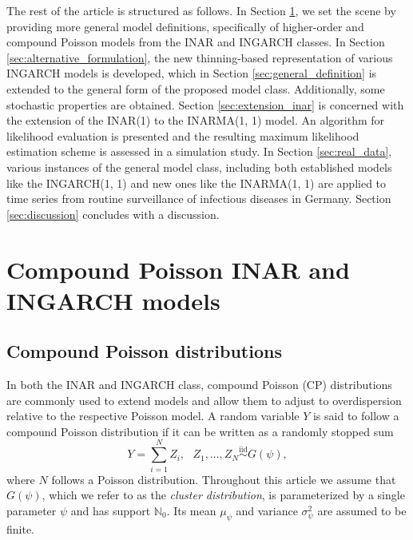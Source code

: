 \documentclass{article}
\begin{document}
The rest of the article is structured as follows. In Section \ref{sec:defintions}, we set the scene by providing more general model definitions, specifically of higher-order and compound Poisson \cite{Schweer2014, Goncalves2015} models from the INAR and INGARCH classes. In Section \ref{sec:alternative_formulation}, the new thinning-based representation of various INGARCH models is developed, which in Section \ref{sec:general_definition} is extended to the general form of the proposed model class. Additionally, some stochastic properties are obtained. Section \ref{sec:extension_inar} is concerned with the extension of the INAR(1) to the INARMA(1, 1) model. An algorithm for likelihood evaluation is presented and the resulting maximum likelihood estimation scheme is assessed in a simulation study. In Section \ref{sec:real_data}, various instances of the general model class, including both established models like the INGARCH(1, 1) and new ones like the INARMA(1, 1) are applied to time series from routine surveillance of infectious diseases in Germany. Section \ref{sec:discussion} concludes with a discussion.


\section{Compound Poisson INAR and INGARCH models}
\label{sec:defintions}

\subsection{Compound Poisson distributions}

In both the INAR and INGARCH class, compound Poisson (CP) distributions are commonly used to extend models and allow them to adjust to overdispersion relative to the respective Poisson model. A random variable $Y$ is said to follow a compound Poisson distribution \cite[Chapter 3]{Feller1968} if it can be written as a randomly stopped sum 
$$
Y = \sum_{i = 1}^N Z_i, \ \ \ Z_1, \dots, Z_N \stackrel{\text{iid}}{\sim} G(\psi),
$$
where $N$ follows a Poisson distribution. Throughout this article we assume that $G(\psi)$, which we refer to as the \textit{cluster distribution}, is parameterized by a single parameter $\psi$ and has support $\mathbb{N}_0$. Its mean $\mu_\psi$ and variance $\sigma^2_\psi$ are assumed to be finite.
\end{document}
